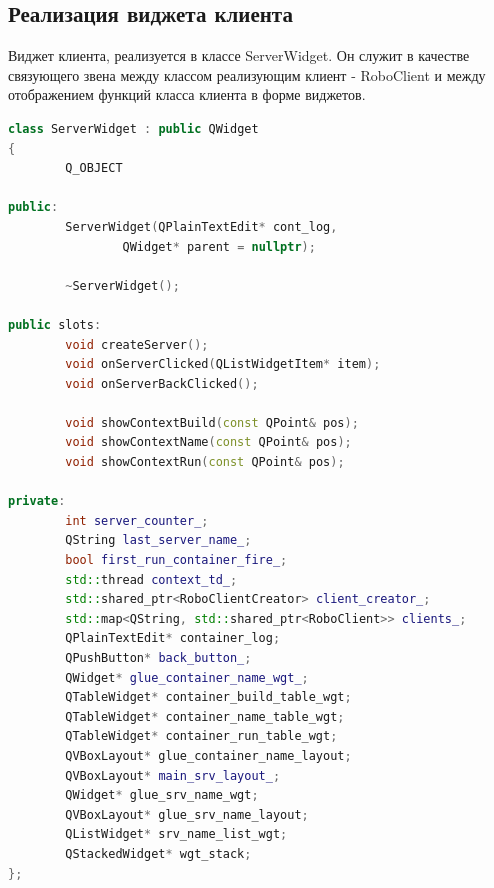 \documentclass[a4paper, 14pt]{extreport}
\begin{document}
\subsection{Реализация виджета клиента}
\par Виджет клиента, реализуется в классе ServerWidget. Он служит в качестве связующего звена между классом реализующим клиент - RoboClient
и между отображением функций класса клиента в форме виджетов.
\begin{lstlisting}[language=C++, frame=single, xleftmargin=15pt, caption={Заголовочный файл класса ServerWidget},label=DescriptiveLabel]
class ServerWidget : public QWidget
{
        Q_OBJECT

public:
        ServerWidget(QPlainTextEdit* cont_log,
                QWidget* parent = nullptr);

        ~ServerWidget();

public slots:
        void createServer();
        void onServerClicked(QListWidgetItem* item);
        void onServerBackClicked();

        void showContextBuild(const QPoint& pos);
        void showContextName(const QPoint& pos);
        void showContextRun(const QPoint& pos);

private:
        int server_counter_;
        QString last_server_name_;
        bool first_run_container_fire_;
        std::thread context_td_;
        std::shared_ptr<RoboClientCreator> client_creator_;
        std::map<QString, std::shared_ptr<RoboClient>> clients_;
        QPlainTextEdit* container_log;
        QPushButton* back_button_;
        QWidget* glue_container_name_wgt_;
        QTableWidget* container_build_table_wgt;
        QTableWidget* container_name_table_wgt;
        QTableWidget* container_run_table_wgt;
        QVBoxLayout* glue_container_name_layout;
        QVBoxLayout* main_srv_layout_;
        QWidget* glue_srv_name_wgt;
        QVBoxLayout* glue_srv_name_layout;
        QListWidget* srv_name_list_wgt;
        QStackedWidget* wgt_stack;
};
\end{lstlisting}

\end{document}
